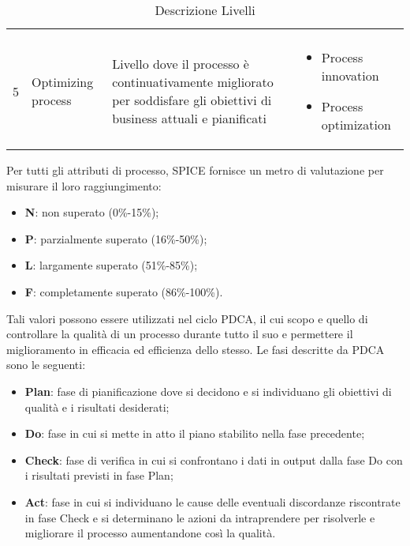 \begin{table}[H]
\begin{tabular}{p{1.1cm} p{2cm} p{6.9cm} p{5.2cm}}
\begin{itemize}
        \end{itemize} \\
        5 & Optimizing process & Livello dove il processo è continuativamente migliorato per soddisfare gli obiettivi di business attuali e pianificati & 
        \begin{itemize}
            \item Process innovation
            \item Process optimization
        \end{itemize} \\
        \end{tabular}
        \caption [Descrizione Livelli ]{Descrizione Livelli} \label{table:DLN} 
    \end{table}
    \pagebreak
    Per tutti gli attributi di processo, SPICE fornisce un metro di valutazione per misurare il loro raggiungimento:
    \begin{itemize}
        \item \textbf{N}: non superato (0\%-15\%);
        \item \textbf{P}: parzialmente superato (16\%-50\%);
        \item \textbf{L}: largamente superato (51\%-85\%);
        \item \textbf{F}: completamente superato (86\%-100\%).
    \end{itemize}
    
    Tali valori possono essere utilizzati nel ciclo PDCA, il cui scopo  e quello
di controllare la qualità di un processo durante tutto il suo  e
permettere il miglioramento in efficacia ed efficienza dello stesso. Le fasi
descritte da PDCA sono le seguenti:
\begin{itemize}
    \item \textbf{Plan}: fase di pianificazione dove si decidono e si individuano gli obiettivi di
qualità e i risultati desiderati;
\item \textbf{Do}: fase in cui si mette in atto il piano stabilito nella fase precedente;
\item \textbf{Check}: fase di verifica in cui si confrontano i dati in output dalla fase Do con i risultati previsti in fase Plan;
\item \textbf{Act}: fase in cui si individuano le cause delle eventuali discordanze riscontrate
in fase Check e si determinano le azioni da intraprendere per risolverle e migliorare il processo aumentandone così la qualità.
\end{itemize}

